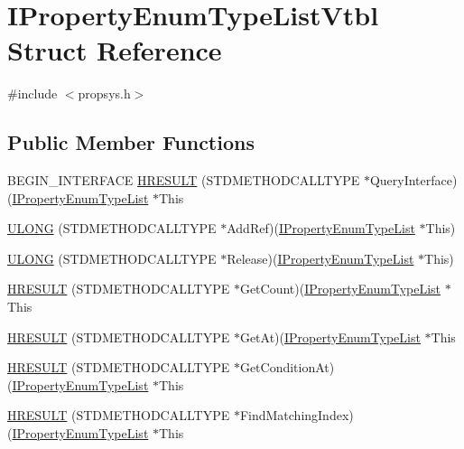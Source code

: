 \hypertarget{struct_i_property_enum_type_list_vtbl}{}\section{I\+Property\+Enum\+Type\+List\+Vtbl Struct Reference}
\label{struct_i_property_enum_type_list_vtbl}


{\ttfamily \#include $<$propsys.\+h$>$}

\subsection*{Public Member Functions}
\begin{DoxyCompactItemize}
\item 
B\+E\+G\+I\+N\+\_\+\+I\+N\+T\+E\+R\+F\+A\+CE \hyperlink{struct_i_property_enum_type_list_vtbl_a798f90d618616e7ee341871ab84357a6}{H\+R\+E\+S\+U\+LT} (S\+T\+D\+M\+E\+T\+H\+O\+D\+C\+A\+L\+L\+T\+Y\+PE $\ast$Query\+Interface)(\hyperlink{propsys_8h_abb95a53fd9421d25c33f81cf706e1c18}{I\+Property\+Enum\+Type\+List} $\ast$This
\item 
\hyperlink{struct_i_property_enum_type_list_vtbl_af97fa1e8ce96d6fd6233640c8d79478a}{U\+L\+O\+NG} (S\+T\+D\+M\+E\+T\+H\+O\+D\+C\+A\+L\+L\+T\+Y\+PE $\ast$Add\+Ref)(\hyperlink{propsys_8h_abb95a53fd9421d25c33f81cf706e1c18}{I\+Property\+Enum\+Type\+List} $\ast$This)
\item 
\hyperlink{struct_i_property_enum_type_list_vtbl_a09b5df067d77f968f6aa3a8bc7c1d615}{U\+L\+O\+NG} (S\+T\+D\+M\+E\+T\+H\+O\+D\+C\+A\+L\+L\+T\+Y\+PE $\ast$Release)(\hyperlink{propsys_8h_abb95a53fd9421d25c33f81cf706e1c18}{I\+Property\+Enum\+Type\+List} $\ast$This)
\item 
\hyperlink{struct_i_property_enum_type_list_vtbl_af03ee5122d683affd75c21683c0547d4}{H\+R\+E\+S\+U\+LT} (S\+T\+D\+M\+E\+T\+H\+O\+D\+C\+A\+L\+L\+T\+Y\+PE $\ast$Get\+Count)(\hyperlink{propsys_8h_abb95a53fd9421d25c33f81cf706e1c18}{I\+Property\+Enum\+Type\+List} $\ast$This
\item 
\hyperlink{struct_i_property_enum_type_list_vtbl_a742875ce11f36f05057a975b721deec8}{H\+R\+E\+S\+U\+LT} (S\+T\+D\+M\+E\+T\+H\+O\+D\+C\+A\+L\+L\+T\+Y\+PE $\ast$Get\+At)(\hyperlink{propsys_8h_abb95a53fd9421d25c33f81cf706e1c18}{I\+Property\+Enum\+Type\+List} $\ast$This
\item 
\hyperlink{struct_i_property_enum_type_list_vtbl_a922a284bbc988185e8cad92ea4a48532}{H\+R\+E\+S\+U\+LT} (S\+T\+D\+M\+E\+T\+H\+O\+D\+C\+A\+L\+L\+T\+Y\+PE $\ast$Get\+Condition\+At)(\hyperlink{propsys_8h_abb95a53fd9421d25c33f81cf706e1c18}{I\+Property\+Enum\+Type\+List} $\ast$This
\item 
\hyperlink{struct_i_property_enum_type_list_vtbl_a6dd8587dc2ef2ada9841032a0757e88f}{H\+R\+E\+S\+U\+LT} (S\+T\+D\+M\+E\+T\+H\+O\+D\+C\+A\+L\+L\+T\+Y\+PE $\ast$Find\+Matching\+Index)(\hyperlink{propsys_8h_abb95a53fd9421d25c33f81cf706e1c18}{I\+Property\+Enum\+Type\+List} $\ast$This
\end{DoxyCompactItemize}
